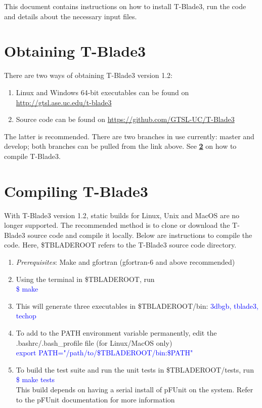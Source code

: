 \documentclass[8pt]{article}
\begin{document}
\noindent
This document contains instructions on how to install T-Blade3, run the code and details about the necessary input files.

\section{Obtaining T-Blade3}
\noindent 
There are two ways of obtaining T-Blade3 version 1.2:
 
\begin{enumerate}[leftmargin=*]
    \item Linux and Windows 64-bit executables can be found on \url{http://gtsl.ase.uc.edu/t-blade3}
    \item Source code can be found on \url{https://github.com/GTSL-UC/T-Blade3}
\end{enumerate}

\noindent
The latter is recommended. There are two branches in use currently: {\selectfont master} and {\selectfont develop}; both branches can be pulled from the link above. See \textbf{\ref{compilesec}} on how to compile T-Blade3.

\section{Compiling T-Blade3}\label{compilesec}
\noindent
With T-Blade3 version 1.2, static builds for Linux, Unix and MacOS are no longer supported. The recommended method is to clone or download the T-Blade3 source code and compile it locally. Below are instructions to compile the code. Here, \$TBLADEROOT refers to the T-Blade3 source code directory. 

\begin{enumerate}[leftmargin=*]
    \item \textit{Prerequisites}: Make and gfortran (gfortran-6 and above recommended)
    \item Using the terminal in \$TBLADEROOT, run\\
          \textcolor{blue}{\selectfont \$ make}
    \item This will generate three executables in \$TBLADEROOT/bin: \textcolor{blue}{\selectfont 3dbgb, tblade3, techop}
    \item To add to the PATH environment variable permanently, edit the .bashrc/.bash\_profile file (for Linux/MacOS only)\\
          \textcolor{blue}{\selectfont export PATH="/path/to/\$TBLADEROOT/bin:\$PATH"}
    \item To build the test suite and run the unit tests in \$TBLADEROOT/tests, run\\
          \textcolor{blue}{\selectfont \$ make tests}\\
          This build depends on having a serial install of pFUnit on the system. Refer to the pFUnit documentation for more information
\end{enumerate}
\end{document}
